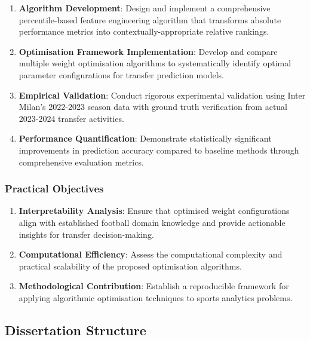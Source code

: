 \begin{enumerate}
    \item \textbf{Algorithm Development}: Design and implement a comprehensive percentile-based feature engineering algorithm that transforms absolute performance metrics into contextually-appropriate relative rankings.
    
    \item \textbf{Optimisation Framework Implementation}: Develop and compare multiple weight optimisation algorithms to systematically identify optimal parameter configurations for transfer prediction models.
    
    \item \textbf{Empirical Validation}: Conduct rigorous experimental validation using Inter Milan's 2022-2023 season data with ground truth verification from actual 2023-2024 transfer activities.
    
    \item \textbf{Performance Quantification}: Demonstrate statistically significant improvements in prediction accuracy compared to baseline methods through comprehensive evaluation metrics.
\end{enumerate}

\subsubsection{Practical Objectives}

\begin{enumerate}
    \item \textbf{Interpretability Analysis}: Ensure that optimised weight configurations align with established football domain knowledge and provide actionable insights for transfer decision-making.
    
    \item \textbf{Computational Efficiency}: Assess the computational complexity and practical scalability of the proposed optimisation algorithms.
    
    \item \textbf{Methodological Contribution}: Establish a reproducible framework for applying algorithmic optimisation techniques to sports analytics problems.
\end{enumerate}

\subsection{Dissertation Structure}

